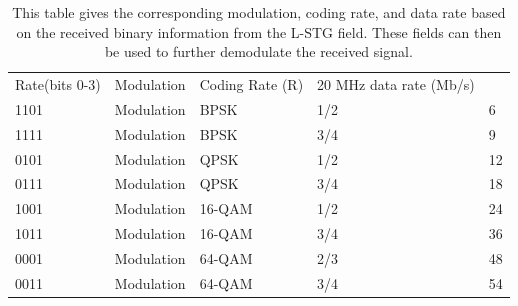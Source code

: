 \begin{table}[ht!]
	\centering
	\begin{tabular}{|l|l|l|l|l|}
		\hline
		Rate(bits 0-3) & Modulation & Coding Rate (R) & 20 MHz data rate (Mb/s)\\
		1101 & Modulation & BPSK & 1/2 & 6 \\
		1111 & Modulation & BPSK & 3/4 & 9 \\
		0101 & Modulation & QPSK & 1/2 & 12 \\
		0111 & Modulation & QPSK & 3/4 & 18 \\
		1001 & Modulation & 16-QAM & 1/2 & 24 \\
		1011 & Modulation & 16-QAM & 3/4 & 36 \\
		0001 & Modulation & 64-QAM & 2/3 & 48 \\
		0011 & Modulation & 64-QAM & 3/4 & 54 \\						
		\hline
	\end{tabular}
	\caption{This table gives the corresponding modulation, coding rate, and data rate based on the received binary information from the L-STG field. These fields can then be used to further demodulate the received signal.}
	\label{table:ofdm_rate_table}
\end{table} \par

